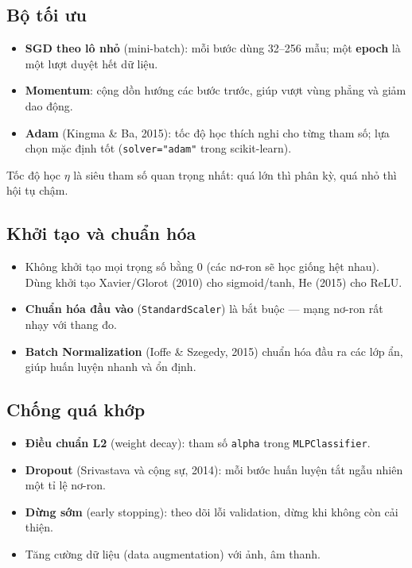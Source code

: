 \subsection{Bộ tối ưu}
\label{sec:optimizers}
\begin{itemize}
    \item \textbf{SGD theo lô nhỏ} (mini-batch): mỗi bước dùng 32--256 mẫu; một \textbf{epoch} là một lượt duyệt hết dữ liệu.
    \item \textbf{Momentum}: cộng dồn hướng các bước trước, giúp vượt vùng phẳng và giảm dao động.
    \item \textbf{Adam} (Kingma \& Ba, 2015): tốc độ học thích nghi cho từng tham số; lựa chọn mặc định tốt (\texttt{solver="adam"} trong scikit-learn).
\end{itemize}
Tốc độ học $\eta$ là siêu tham số quan trọng nhất: quá lớn thì phân kỳ, quá nhỏ thì hội tụ chậm.

\subsection{Khởi tạo và chuẩn hóa}
\begin{itemize}
    \item Không khởi tạo mọi trọng số bằng 0 (các nơ-ron sẽ học giống hệt nhau). Dùng khởi tạo Xavier/Glorot (2010) cho sigmoid/tanh, He (2015) cho ReLU.
    \item \textbf{Chuẩn hóa đầu vào} (\texttt{StandardScaler}) là bắt buộc --- mạng nơ-ron rất nhạy với thang đo.
    \item \textbf{Batch Normalization} (Ioffe \& Szegedy, 2015) chuẩn hóa đầu ra các lớp ẩn, giúp huấn luyện nhanh và ổn định.
\end{itemize}

\subsection{Chống quá khớp}
\begin{itemize}
    \item \textbf{Điều chuẩn L2} (weight decay): tham số \texttt{alpha} trong \texttt{MLPClassifier}.
    \item \textbf{Dropout} (Srivastava và cộng sự, 2014): mỗi bước huấn luyện tắt ngẫu nhiên một tỉ lệ nơ-ron.
    \item \textbf{Dừng sớm} (early stopping): theo dõi lỗi validation, dừng khi không còn cải thiện.
    \item Tăng cường dữ liệu (data augmentation) với ảnh, âm thanh.
\end{itemize}

